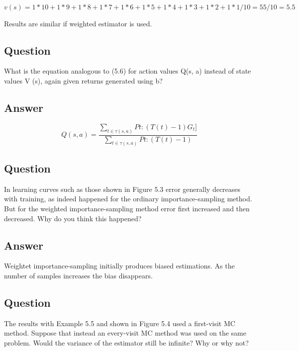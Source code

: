 \documentclass[11pt]{article}
\begin{document}
    $ v(s) = 1 * 10 + 1 * 9 + 1 * 8 + 1 * 7 + 1 * 6 + 1 * 5 + 1* 4 + 1 * 3 + 1 * 2 + 1 * 1 / 10 =  55 / 10 = 5.5 $

    Results are similar if weighted estimator is used.

    \subsection{Question}

    What is the equation analogous to (5.6) for action values Q(s, a) instead of state values V (s), again given returns generated using b?


    \subsection*{Answer}

    \begin{equation}
        Q(s,a) = \frac{\sum_{t \in \tau (s,a) } Pt:(T(t)-1) G_{t}] }{ \sum_{t \in \tau (s,a) } Pt:(T(t)-1) }
    \end{equation}

    \subsection{Question}

    In learning curves such as those shown in Figure 5.3 error generally decreases with training, as indeed happened for the ordinary importance-sampling method.
    But for the weighted importance-sampling method error first increased and then decreased.
    Why do you think this happened?

    \subsection*{Answer}

    Weightet importance-sampling initially produces biased estimations.
    As the number of samples increases the bias disappears.

    \subsection{Question}

    The results with Example 5.5 and shown in Figure 5.4 used a first-visit MC method.
    Suppose that instead an every-visit MC method was used on the same problem.
    Would the variance of the estimator still be infinite? Why or why not?
\end{document}
